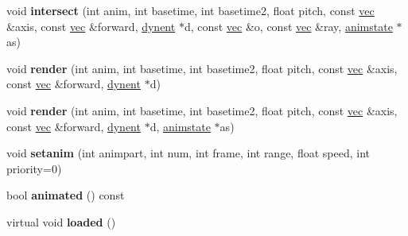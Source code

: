 \begin{DoxyCompactItemize}
void {\bfseries intersect} (int anim, int basetime, int basetime2, float pitch, const \hyperlink{structvec}{vec} \&axis, const \hyperlink{structvec}{vec} \&forward, \hyperlink{structdynent}{dynent} $\ast$d, const \hyperlink{structvec}{vec} \&o, const \hyperlink{structvec}{vec} \&ray, \hyperlink{structanimmodel_1_1animstate}{animstate} $\ast$as)
\item 
\mbox{\label{structanimmodel_1_1part_acea0f18291914b82d383d19c6aebd74b}} 
void {\bfseries render} (int anim, int basetime, int basetime2, float pitch, const \hyperlink{structvec}{vec} \&axis, const \hyperlink{structvec}{vec} \&forward, \hyperlink{structdynent}{dynent} $\ast$d)
\item 
\mbox{\label{structanimmodel_1_1part_a319578b1696157d595e67070c5010f5e}} 
void {\bfseries render} (int anim, int basetime, int basetime2, float pitch, const \hyperlink{structvec}{vec} \&axis, const \hyperlink{structvec}{vec} \&forward, \hyperlink{structdynent}{dynent} $\ast$d, \hyperlink{structanimmodel_1_1animstate}{animstate} $\ast$as)
\item 
\mbox{\label{structanimmodel_1_1part_a2b59bf6902b0a746a142ccbc420c3ffa}} 
void {\bfseries setanim} (int animpart, int num, int frame, int range, float speed, int priority=0)
\item 
\mbox{\label{structanimmodel_1_1part_a1b304e7a95a015324613c8af6794dfb5}} 
bool {\bfseries animated} () const
\item 
\mbox{\label{structanimmodel_1_1part_afec2c666ca865b6e676110f058b2b125}} 
virtual void {\bfseries loaded} ()
\end{DoxyCompactItemize}
